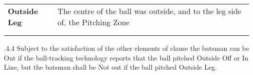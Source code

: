\documentclass[12pt]{article}
\begin{document}


\vspace{\baselineskip}

\vspace{\baselineskip}

\vspace{\baselineskip}

\vspace{\baselineskip}

\vspace{\baselineskip}
\begin{adjustwidth}{0.0in}{0.08in}
\begin{Center}
{\fontsize{8pt}{9.6pt}\par}
\end{Center}\par

\end{adjustwidth}


\vspace{\baselineskip}




\begin{table}[H]
 			\centering
\begin{tabular}{p{1in}p{1in}}
\multicolumn{1}{p{1in}}{{\fontsize{9pt}{10.8pt}\selectfont \textbf{Outside Leg}}} & 
\multicolumn{1}{p{1in}}{{\fontsize{9pt}{10.8pt}\selectfont The centre of the ball was outside, and to the leg side of, the Pitching Zone}} \\
\hhline{~~}
\multicolumn{1}{p{1in}}{} & 
\multicolumn{1}{p{1in}}{} \\
\hhline{~~}

\end{tabular}
 \end{table}




\vspace{\baselineskip}
\begin{adjustwidth}{1.18in}{0.25in}
{\fontsize{9pt}{10.8pt}.4.4 \tabto{1.17in} Subject to the satisfaction of the other elements of clause the batsman can be Out if the ball-tracking technology reports that the ball pitched Outside Off or In Line, but the batsman shall be Not out if the ball pitched Outside Leg.\par}\par

\end{adjustwidth}
\end{document}
